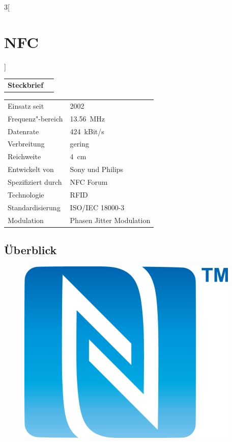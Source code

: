 \begin{multicols}{3}[\section{NFC}]


\newrefsegment

\begin{tabular}{p{}p{2.7 cm}}
\textbf{Steckbrief}& \\
\end{tabular}
\begin{tabular}{p{}p{2.7 cm}}
      Einsatz seit & 2002\\
      Frequenz"-bereich  & \SI{13.56}{\mega\hertz}\\
      Datenrate & \SI{424}{kBit/s}\\
      Verbreitung & gering\\
      Reichweite & \SI{4}{cm}\\
      Entwickelt von & Sony und Philips \\
      Spezifiziert durch & NFC Forum \\
      Technologie & RFID \\
      Standardisierung & ISO/IEC 18000-3 \\
      Modulation & Phasen Jitter Modulation \\
\end{tabular}
\par


\subsection*{Überblick}
\begin{figure} 
\vspace{-20pt} 
\begin{center} 
\hspace{-20pt} 
\includegraphics[width=0.7\linewidth]{Kapitel/NFC/Grafiken/Logo.jpg} 
\end{center} 
\vspace{-15pt} 
\end{figure} 



\end{multicols}
